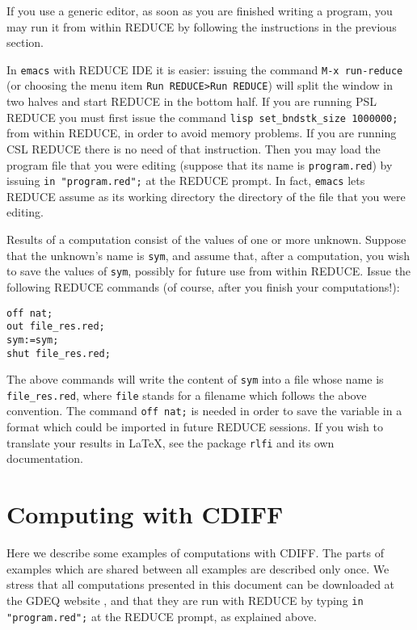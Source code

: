\documentclass[12pt]{amsart}
\theoremstyle{definition}
\newcommand{\cdiff}{CDIFF\xspace}
\newcommand{\reduce}{REDUCE\xspace}
\begin{document}
If you use a generic editor, as soon as you are finished writing a program, you
may run it from within \reduce by following the instructions in the previous
section.

In \texttt{emacs} with \reduce IDE it is easier: issuing the command
\texttt{M-x run-reduce} (or choosing the menu item \texttt{Run REDUCE>Run
  REDUCE}) will split the window in two halves and start \reduce in the bottom
half. If you are running PSL \reduce you must first issue the command
\texttt{lisp set\_bndstk\_size 1000000;} from within \reduce, in order to avoid
memory problems. If you are running CSL \reduce there is no need of that
instruction. Then you may load the program file that you were editing (suppose
that its name is \texttt{program.red}) by issuing \texttt{in "program.red";} at
the \reduce prompt. In fact, \texttt{emacs} lets \reduce assume as its working
directory the directory of the file that you were editing.

Results of a computation consist of the values of one or more unknown. Suppose
that the unknown's name is \texttt{sym}, and assume that, after a computation,
you wish to save the values of \texttt{sym}, possibly for future use from within
\reduce. Issue the following \reduce commands (of course, after you finish your
computations!):
\begin{verbatim}
off nat;
out file_res.red;
sym:=sym;
shut file_res.red;
\end{verbatim}
The above commands will write the content of \texttt{sym} into a file whose
name is \texttt{file\_res.red}, where \texttt{file} stands for a filename which
follows the above convention. The command \texttt{off nat;} is needed in order
to save the variable in a format which could be imported in future \reduce
sessions. If you wish to translate your results in \LaTeX, see the package
\texttt{rlfi} and its own documentation.

\section{Computing with \cdiff}

Here we describe some examples of computations with \cdiff. The parts of
examples which are shared between all examples are described only once. We
stress that all computations presented in this document can be downloaded at
the GDEQ website \cite{gdeq}, and that they are run with \reduce by typing
\texttt{in "program.red";} at the \reduce prompt, as explained above.
\end{document}
